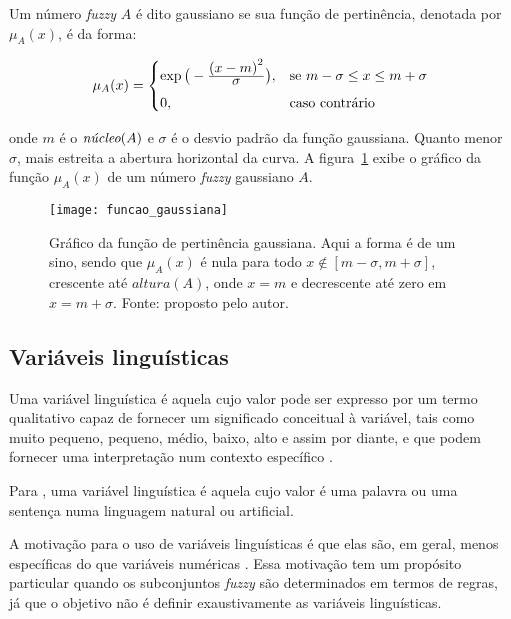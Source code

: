 \begin{defn}
\label{def:funcao_fuzzy_gaussiana}
Um número \emph{fuzzy} $A$ é dito gaussiano se sua função de pertinência, denotada por $\mu_{A}(x)$, é da forma:

\begin{equation}
  \mu_A(x) =  \begin{cases}
                \exp{\big(-\ensuremath{\frac{\displaystyle {(x - m)}^2}{\displaystyle \sigma}} \big)}, & \text{se}\ m - \sigma \leq x \leq m + \sigma\\[0.5em]
                0, & \text{caso contrário}
              \end{cases}
\end{equation}
\end{defn}
\noindent onde $m$ é o $\emph{núcleo}(A)$ e $\sigma$ é o desvio padrão da função gaussiana. Quanto menor $\sigma$, mais estreita a abertura horizontal da curva. A figura~\ref{fig:funcao_fuzzy_gaussiana} exibe o gráfico da função $\mu_A(x)$ de um número \emph{fuzzy} gaussiano $A$.

\begin{figure}[!h]
  \centering
  \texttt{[image: funcao\_gaussiana]}
  \caption[Gráfico da função de pertinência gaussiana]{Gráfico da função de pertinência gaussiana. Aqui a forma é de um sino, sendo que $\mu_A(x)$ é nula para todo $x \notin [m - \sigma, m + \sigma]$, crescente  até $altura(A)$, onde $x = m$ e decrescente até zero em $x = m + \sigma$. Fonte: proposto pelo autor.}
  \label{fig:funcao_fuzzy_gaussiana}
\end{figure}


\subsection{Variáveis linguísticas}
\label{sec:variaveis_linguisticas}
Uma variável linguística é aquela cujo valor pode ser expresso por um termo qualitativo capaz de fornecer um significado conceitual à variável, tais como muito pequeno, pequeno, médio, baixo, alto e assim por diante, e que podem fornecer uma interpretação num contexto específico \citep{pedrycz:98}.

Para \citet{zadeh:75}, uma variável linguística é aquela cujo valor é uma palavra ou uma sentença numa linguagem natural ou artificial.

A motivação para o uso de variáveis linguísticas é que elas são, em geral, menos específicas do que variáveis numéricas \citep{zadeh:75}. Essa motivação tem um propósito particular quando os subconjuntos \emph{fuzzy} são determinados em termos de regras, já que o objetivo não é definir exaustivamente as variáveis linguísticas.

